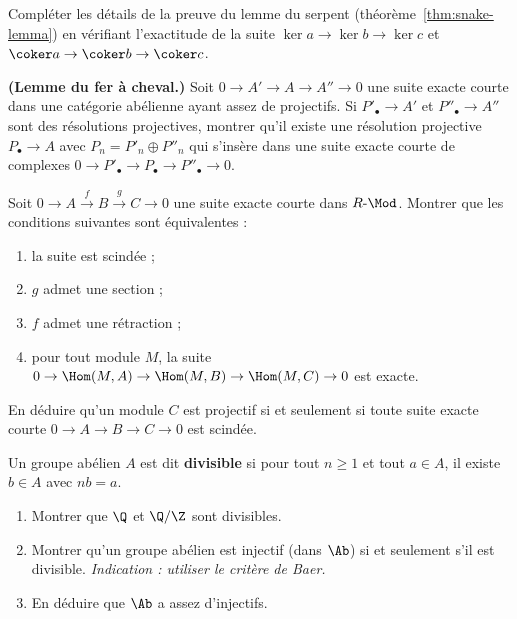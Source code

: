 \begin{exercice}\label{exo:snake-details}
Compléter les détails de la preuve du lemme du serpent
(théorème~\ref{thm:snake-lemma}) en vérifiant l'exactitude de la suite
$\ker a \to \ker b \to \ker c$ et $\coker a \to \coker b \to \coker c$.
\end{exercice}

\begin{exercice}\label{exo:horseshoe}
\textbf{(Lemme du fer à cheval.)}
Soit $0 \to A' \to A \to A'' \to 0$ une suite exacte courte dans
une catégorie abélienne ayant assez de projectifs. Si $P'_\bullet \to A'$
et $P''_\bullet \to A''$ sont des résolutions projectives, montrer qu'il
existe une résolution projective $P_\bullet \to A$ avec
$P_n = P'_n \oplus P''_n$ qui s'insère dans une suite exacte courte
de complexes $0 \to P'_\bullet \to P_\bullet \to P''_\bullet \to 0$.
\end{exercice}

\begin{exercice}\label{exo:ses-projective}
Soit $0 \to A \xrightarrow{f} B \xrightarrow{g} C \to 0$ une suite
exacte courte dans $R\text{-}\Mod$. Montrer que les conditions
suivantes sont équivalentes :
\begin{enumerate}[label=(\roman*)]
\item la suite est scindée ;
\item $g$ admet une section ;
\item $f$ admet une rétraction ;
\item pour tout module $M$, la suite
  $0 \to \Hom(M, A) \to \Hom(M, B) \to \Hom(M, C) \to 0$ est exacte.
\end{enumerate}
En déduire qu'un module $C$ est projectif si et seulement si toute suite
exacte courte $0 \to A \to B \to C \to 0$ est scindée.
\end{exercice}

\begin{exercice}\label{exo:injective-divisible}
Un groupe abélien $A$ est dit \textbf{divisible} si pour
tout $n \geq 1$ et tout $a \in A$, il existe $b \in A$ avec $nb = a$.
\begin{enumerate}[label=(\alph*)]
\item Montrer que $\Q$ et $\Q/\Z$ sont divisibles.
\item Montrer qu'un groupe abélien est injectif (dans $\Ab$) si et seulement
  s'il est divisible.
  \textit{Indication : utiliser le critère de Baer.}
\item En déduire que $\Ab$ a assez d'injectifs.
\end{enumerate}
\end{exercice}

